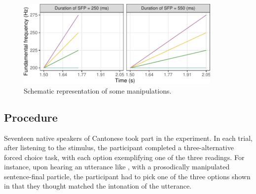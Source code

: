 \documentclass[output=paper,colorlinks,citecolor=brown            ,chinesefont]{langscibook}
\begin{document}
\begin{figure}
    \centering
    \includegraphics[width=10cm]{figures/stimuli.pdf}
    \caption{Schematic representation of some manipulations.}
    \label{fig:stimuli}
\end{figure}

\subsection{Procedure}\label{subsubsec:procedure}

Seventeen native speakers of Cantonese took part in the experiment. In each trial, after listening to the stimulus, the participant completed a three-alternative forced choice task, with each option exemplifying one of the three readings. For instance, upon hearing an utterance like , with a prosodically manipulated sentence-final particle, the participant had to pick one of the three options shown in  that they thought matched the intonation of the utterance.
\end{document}
